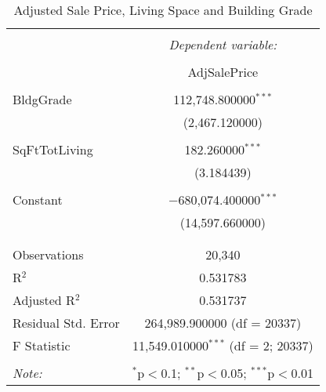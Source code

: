 
\begin{table}[!htbp] \centering 
  \caption{Adjusted Sale Price, Living Space and Building Grade} 
  \label{tab:SqFtTotLiving_bldGrade} 
\begin{tabular}{@{\extracolsep{5pt}}lc} 
\\[-1.8ex]\hline 
\hline \\[-1.8ex] 
 & \multicolumn{1}{c}{\textit{Dependent variable:}} \\ 
\cline{2-2} 
\\[-1.8ex] & AdjSalePrice \\ 
\hline \\[-1.8ex] 
 BldgGrade & 112,748.800000$^{***}$ \\ 
  & (2,467.120000) \\ 
  & \\ 
 SqFtTotLiving & 182.260000$^{***}$ \\ 
  & (3.184439) \\ 
  & \\ 
 Constant & $-$680,074.400000$^{***}$ \\ 
  & (14,597.660000) \\ 
  & \\ 
\hline \\[-1.8ex] 
Observations & 20,340 \\ 
R$^{2}$ & 0.531783 \\ 
Adjusted R$^{2}$ & 0.531737 \\ 
Residual Std. Error & 264,989.900000 (df = 20337) \\ 
F Statistic & 11,549.010000$^{***}$ (df = 2; 20337) \\ 
\hline 
\hline \\[-1.8ex] 
\textit{Note:}  & \multicolumn{1}{r}{$^{*}$p$<$0.1; $^{**}$p$<$0.05; $^{***}$p$<$0.01} \\ 
\end{tabular} 
\end{table}  
